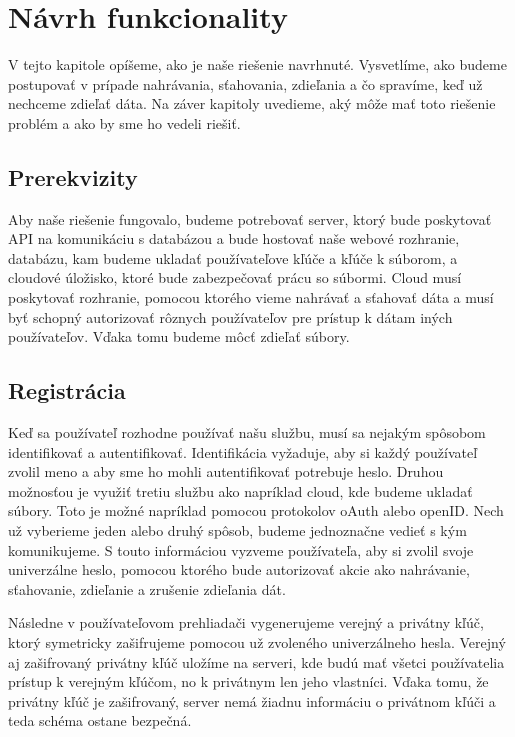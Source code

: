 \chapter{Návrh funkcionality}
	V tejto kapitole opíšeme, ako je naše riešenie navrhnuté. Vysvetlíme, ako budeme postupovať v prípade nahrávania, sťahovania, zdieľania a čo spravíme, keď už nechceme zdieľať dáta. Na záver kapitoly uvedieme, aký môže mať toto riešenie problém a ako by sme ho vedeli riešiť.
	
	\section{Prerekvizity}
	
		Aby naše riešenie fungovalo, budeme potrebovať server, ktorý bude poskytovať API na komunikáciu s databázou a bude hostovať naše webové rozhranie, databázu, kam budeme ukladať používateľove kľúče a kľúče k súborom, a cloudové úložisko, ktoré bude zabezpečovať prácu so súbormi. Cloud musí poskytovať rozhranie, pomocou ktorého vieme nahrávať a sťahovať dáta a musí byť schopný autorizovať rôznych používateľov pre prístup k dátam iných používateľov. Vďaka tomu budeme môcť zdieľať súbory. 
		
	\section{Registrácia}
		
		Keď sa používateľ rozhodne používať našu službu, musí sa nejakým spôsobom identifikovať a autentifikovať. Identifikácia vyžaduje, aby si každý používateľ zvolil meno a aby sme ho mohli autentifikovať potrebuje heslo. Druhou možnosťou je využiť tretiu službu ako napríklad cloud, kde budeme ukladať súbory. Toto je možné napríklad pomocou protokolov oAuth alebo openID. Nech už vyberieme jeden alebo druhý spôsob, budeme jednoznačne vedieť s kým komunikujeme. S touto informáciou vyzveme používateľa, aby si zvolil svoje univerzálne heslo, pomocou ktorého bude autorizovať akcie ako nahrávanie, sťahovanie, zdieľanie a zrušenie zdieľania dát.
		
		Následne v používateľovom prehliadači vygenerujeme verejný a privátny kľúč, ktorý symetricky zašifrujeme pomocou už zvoleného univerzálneho hesla. Verejný aj zašifrovaný privátny kľúč uložíme na serveri, kde budú mať všetci používatelia prístup k verejným kľúčom, no k privátnym len jeho vlastníci. Vďaka tomu, že privátny kľúč je zašifrovaný, server nemá žiadnu informáciu o privátnom kľúči a teda schéma ostane bezpečná. 
		
